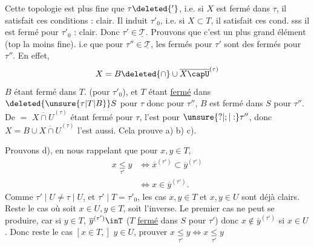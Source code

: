 Cette topologie est plus fine que $\tau\deleted{'}$, i.e. si $X$ est fermé dans $\tau$, il satisfait ces conditions : clair. Il induit $\tau'_0$, i.e. si $X\subset T$, il satisfait ces cond. sss il est fermé pour $\tau'_0$ : clair. Donc $\tau'\in\underline{\mathscr{T}}$. Prouvons que c'est un plus grand élément (top la moins fine). i.e que pour  $\tau''\in\underline{\mathscr{T}}$, les fermés pour $\tau'$ sont des fermés pour $\tau''$. En effet, 
\[
X=B\deleted{\cap}\cup\overline{X\capU}^{(\tau)}
\]
$B$ étant fermé dans $T$. (pour $\tau'_0$), et $T$ étant \uline{fermé} dans $\deleted{\unsure{\tau|T|B}}S$ pour $\tau$ donc  pour $\tau''$, $B$ est fermé dans $S$ pour $\tau''$.
De $=$ $\overline{X\cap U}^{(\tau)}$ étant fermé pour $\tau$, l'est pour $\unsure{?|;|:}\tau''$, donc $X=B\cup\overline{X\cap U}^{(\tau)}$ l'est aussi. Cela prouve a) b) c).

Prouvons d), en nous rappelant que pour $x,y\in T$,
\[
\begin{aligned}
x\underset{\tau'}{\leq}y&\Longleftrightarrow\overline{x}^{(\tau')}\subset\overline{y}^{(\tau')}\\
&\Longleftrightarrow x\in\overline{y}^{(\tau')}.
\end{aligned}
\]
Comme $\tau'\mid U\ne\tau\mid U$, et $\tau'\mid T=\tau'_0$, les cas $x,y\in T$ et $x,y\in U$ sont déjà clairs. Reste le cas où soit $x\in U,y\in T$, soit l'inverse. Le premier cas ne peut se produire, car si $y\in T$, $\overline{y}^{(\tau')}\inT$ ($T$ \uline{fermé} dans $S$ pour $\tau'$) donc $x\notin\overline{y}^{(\tau')}$  si $x\in U$. Donc reste le cas $[x\in T,]$ $y\in U$, prouver $x\underset{\tau'}{\leq}y\Longleftrightarrow x\underset{\tau'}{\leq}y$
